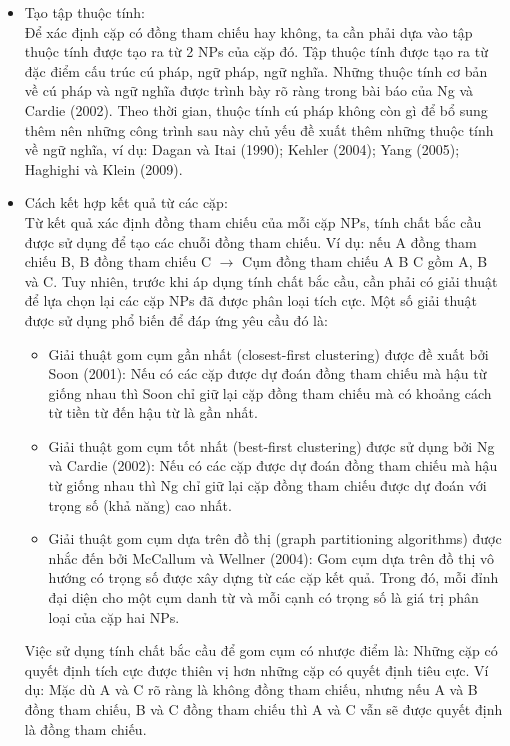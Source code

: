 \documentclass[12pt]{report}
\begin{document}
				\begin{itemize}
					\item{Tạo tập thuộc tính: 
						\\Để xác định cặp có đồng tham chiếu hay không, ta cần phải dựa vào tập thuộc tính được tạo ra từ 2 NPs của cặp đó. Tập thuộc tính được tạo ra từ đặc điểm cấu trúc cú pháp, ngữ pháp, ngữ nghĩa. Những thuộc tính cơ bản về cú pháp và ngữ nghĩa được trình bày rõ ràng trong bài báo của Ng và Cardie (2002)\cite{ng02}. Theo thời gian, thuộc tính cú pháp không còn gì để bổ sung thêm nên những công trình sau này chủ yếu đề xuất thêm những thuộc tính về ngữ nghĩa, ví dụ: Dagan và Itai (1990)\cite{dagan90}; Kehler (2004)\cite{kehler04}; Yang (2005)\cite{yang05}; Haghighi và Klein (2009)\cite{haghighi09}.}
					\item{Cách kết hợp kết quả từ các cặp: 
						\\Từ kết quả xác định đồng tham chiếu của mỗi cặp NPs, tính chất bắc cầu được sử dụng để tạo các chuỗi đồng tham chiếu. Ví dụ: nếu A đồng tham chiếu B, B đồng tham chiếu C $\rightarrow$ Cụm đồng tham chiếu {A B C} gồm A, B và C. Tuy nhiên, trước khi áp dụng tính chất bắc cầu, cần phải có giải thuật để lựa chọn lại các cặp NPs đã được phân loại tích cực. Một số giải thuật được sử dụng phổ biến để đáp ứng yêu cầu đó là:
						\begin{itemize}
							\item{Giải thuật gom cụm gần nhất (closest-first clustering) được đề xuất bởi Soon (2001)\cite{soon01}: Nếu có các cặp được dự đoán đồng tham chiếu mà hậu từ giống nhau thì Soon chỉ giữ lại cặp đồng tham chiếu mà có khoảng cách từ tiền từ đến hậu từ là gần nhất.}
							\item{Giải thuật gom cụm tốt nhất (best-first clustering) được sử dụng bởi Ng và Cardie (2002)\cite{ng02}: Nếu có các cặp được dự đoán đồng tham chiếu mà hậu từ giống nhau thì Ng chỉ giữ lại cặp đồng tham chiếu được dự đoán với trọng số (khả năng) cao nhất.}
							\item{Giải thuật gom cụm dựa trên đồ thị (graph partitioning algorithms) được nhắc đến bởi McCallum và Wellner (2004)\cite{mccallum04}: Gom cụm dựa trên đồ thị vô hướng có trọng số được xây dựng từ các cặp kết quả. Trong đó, mỗi đỉnh đại diện cho một cụm danh từ và mỗi cạnh có trọng số là giá trị phân loại của cặp hai NPs.}
						\end{itemize}}
						\par  Việc sử dụng tính chất bắc cầu để gom cụm có nhược điểm là: Những cặp có quyết định tích cực được thiên vị hơn những cặp có quyết định tiêu cực. Ví dụ: Mặc dù A và C rõ ràng là không đồng tham chiếu, nhưng nếu A và B đồng tham chiếu, B và C đồng tham chiếu thì A và C vẫn sẽ được quyết định là đồng tham chiếu.
				\end{itemize}			 
\end{document}
